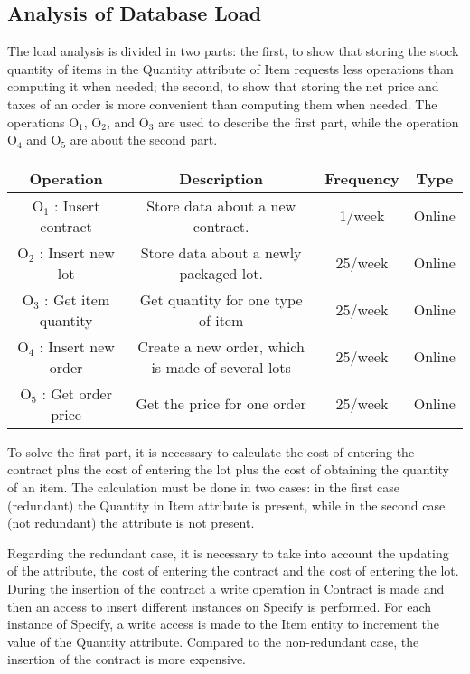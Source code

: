 \newpage
\subsection{Analysis of Database Load}
The load analysis is divided in two parts: the first, to show that storing the stock quantity of items in the Quantity attribute of Item requests less operations than computing it when needed; the second, to show that storing the net price and taxes of an order is more convenient than computing them when needed.
The operations $ \textrm{O}_\textrm{1} $, $ \textrm{O}_\textrm{2} $, and $ \textrm{O}_\textrm{3} $ are used to describe the first part, while the operation $ \textrm{O}_\textrm{4} $ and $ \textrm{O}_\textrm{5} $ are about the second part.
\begin{table}[!h]
	\begin{center}
		\begin{tabular}{ | c | c | c | c | }
			\hline
			\textbf{Operation} & \textbf{Description} & \textbf{Frequency} & \textbf{Type} \\ \hline
			$ \textrm{O}_\textrm{1} $ : Insert contract & Store data about a new contract. & 1/week & Online \\ \hline
			$ \textrm{O}_\textrm{2} $ : Insert new lot & Store data about a newly packaged lot. & 25/week & Online \\ \hline
			$ \textrm{O}_\textrm{3} $ : Get item quantity  & Get quantity for one type of item & 25/week & Online \\\hline
			$ \textrm{O}_\textrm{4} $ : Insert new order  & Create a new order, which is made of several lots & 25/week & Online \\\hline
			$ \textrm{O}_\textrm{5} $ : Get order price  & Get the price for one order & 25/week & Online \\\hline
		\end{tabular}
	\end{center}
\end{table}

To solve the first part, it is necessary to calculate the cost of entering the contract plus the cost of entering the lot plus the cost of obtaining the quantity of an item. The calculation must be done in two cases: in the first case (redundant) the Quantity in Item attribute is present, while in the second case (not redundant) the attribute is not present.

Regarding the redundant case, it is necessary to take into account the updating of the attribute, the cost of entering the contract and the cost of entering the lot.
During the insertion of the contract a write operation in Contract is made and then an access to insert different instances on Specify is performed. For each instance of Specify, a write access is made to the Item entity to increment the value of the Quantity attribute. Compared to the non-redundant case, the insertion of the contract is more expensive.

